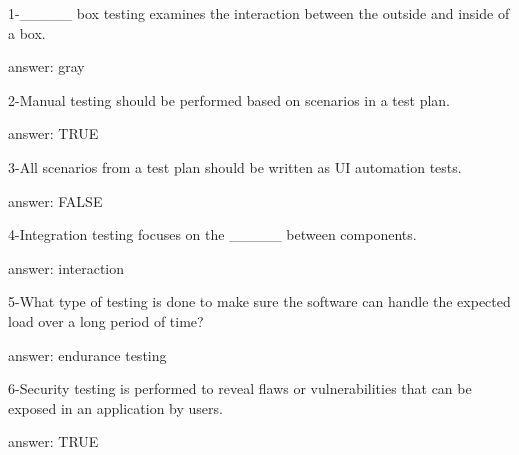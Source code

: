 1-_____ box testing examines the interaction between the outside and inside of a box.


answer: gray

2-Manual testing should be performed based on scenarios in a test plan.


answer: TRUE

3-All scenarios from a test plan should be written as UI automation tests.


answer: FALSE

4-Integration testing focuses on the _____ between components.


answer: interaction

5-What type of testing is done to make sure the software can handle the expected load over a long period of time?


answer: endurance testing

6-Security testing is performed to reveal flaws or vulnerabilities that can be exposed in an application by users.


answer: TRUE